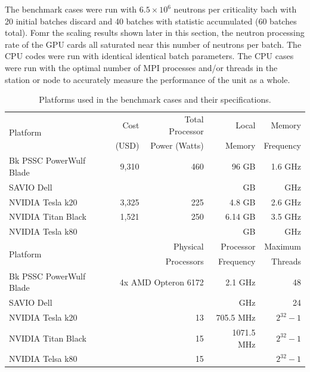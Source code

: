 \documentclass[preprint,12pt]{elsarticle}
\begin{document}
The benchmark cases were run with $6.5\times10^6$ neutrons per criticality bach with 20 initial batches discard and 40 batches with statistic accumulated (60 batches total).  Fomr the scaling results shown later in this section, the neutron processing rate of the GPU cards all saturated near this number of neutrons per batch.  The CPU codes were run with identical identical batch parameters.  The CPU cases were run with the optimal number of MPI processes and/or threads in the station or node to accurately measure the performance of the unit as a whole.    

\begin{table}[h]
\centering
\caption{Platforms used in the benchmark cases and their specifications.}
\label{platform_table}
\small
\begin{tabular}{| l | r | r | r | r |}
\hline
\multirow{2}{*}{Platform} &  Cost   &Total Processor  & Local       & Memory     \\
                                       & (USD)  & Power (Watts) & Memory  & Frequency \\
\hline
Bk PSSC PowerWulf Blade       &    9,310   & 460 &  96 GB        &  1.6 GHz                    \\
\hline
SAVIO Dell       &       &  &   GB        &   GHz                    \\
\hline
NVIDIA Tesla k20         &    3,325     & 225 &  4.8  GB      &  2.6 GHz                  \\
\hline
NVIDIA Titan Black       &     1,521   & 250 &  6.14 GB        & 3.5 GHz              \\
\hline
NVIDIA Tesla k80       &        &  &   GB        &  GHz              \\
\hline
\hline
\hline
\multirow{2}{*}{Platform}  &  \multicolumn{2}{r|}{Physical }     & Processor  & Maximum \\
                                        & \multicolumn{2}{r|}{Processors}  & Frequency  & Threads \\
\hline
Bk PSSC PowerWulf Blade       &   \multicolumn{2}{r|}{4x AMD Opteron 6172 }  &  2.1 GHz     &  48           \\
\hline
SAVIO Dell                     &   \multicolumn{2}{r|}{ }  &   GHz     &  24           \\
\hline
NVIDIA Tesla k20         &       \multicolumn{2}{r|}{13}   &  705.5 MHz     &  $2^{32}-1$           \\
\hline
NVIDIA Titan Black       &      \multicolumn{2}{r|}{ 15 }  &  1071.5 MHz     & $2^{32}-1$           \\
\hline
NVIDIA Telsa k80      &      \multicolumn{2}{r|}{ 15 }  &       & $2^{32}-1$           \\
\hline

\end{tabular}
\end{table}
\end{document}
